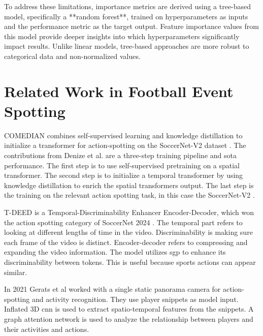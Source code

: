 To address these limitations, importance metrics are derived using a tree-based model, specifically a **random forest**, trained on hyperparameters as inputs and the performance metric as the target output. Feature importance values from this model provide deeper insights into which hyperparameters significantly impact results. Unlike linear models, tree-based approaches are more robust to categorical data and non-normalized values.

\section{Related Work in Football Event Spotting}
\label{sec:fw_work}

COMEDIAN \cite{denize_comedian_2024} combines self-supervised learning and knowledge distillation to initialize a transformer for action-spotting on the SoccerNet-V2 dataset \cite{deliege_soccernet-v2_dataset_2021}. The contributions from Denize et al. are a three-step training pipeline and \acrshort{sota} performance. The first step is to use self-supervised pretraining on a spatial transformer. The second step is to initialize a temporal transformer by using knowledge distillation to enrich the spatial transformers output. The last step is the training on the relevant action spotting task, in this case the SoccerNet-V2 \cite{deliege_soccernet-v2_dataset_2021}.

T-DEED \cite{xarles_t-deed_2024} is a Temporal-Discriminability Enhancer Encoder-Decoder, which won the action spotting category of SoccerNet 2024 \cite{cioppa_soccernet_2024}. The temporal part refers to looking at different lengths of time in the video. Discriminability is making sure each frame of the video is distinct. Encoder-decoder refers to compressing and expanding the video information. The model utilizes \acrfull{sgp} to enhance its discriminability between tokens. This is useful because sports actions can appear similar. 

In 2021 Gerats et al\cite{gerats_individual_same_task_2021} worked with a single static panorama camera for action-spotting and activity recognition. They use player snippets as model input. Inflated 3D \acrshort{cnn} is used to extract spatio-temporal features from the snippets. A graph attention network is used to analyze the relationship between players and their activities and actions.


